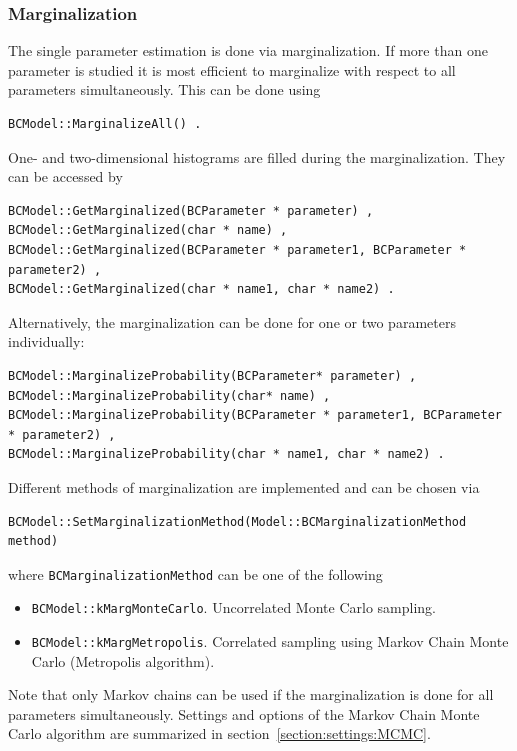 \documentclass[11pt, a4paper]{article}
\begin{document}

\subsubsection{Marginalization} 
\label{subsubsection:marginalization}

\noindent 
The single parameter estimation is done via marginalization. If more
than one parameter is studied it is most efficient to marginalize with
respect to all parameters simultaneously. This can be done using
%
\begin{verbatim}
BCModel::MarginalizeAll() . 
\end{verbatim} 

\noindent 
One- and two-dimensional histograms are filled during the
marginalization. They can be accessed by
%
\begin{verbatim}
BCModel::GetMarginalized(BCParameter * parameter) ,
BCModel::GetMarginalized(char * name) ,
BCModel::GetMarginalized(BCParameter * parameter1, BCParameter * parameter2) ,
BCModel::GetMarginalized(char * name1, char * name2) .
\end{verbatim}

\noindent 
Alternatively, the marginalization can be done for one or two
parameters individually: 
%
\begin{verbatim}
BCModel::MarginalizeProbability(BCParameter* parameter) ,
BCModel::MarginalizeProbability(char* name) , 
BCModel::MarginalizeProbability(BCParameter * parameter1, BCParameter * parameter2) ,
BCModel::MarginalizeProbability(char * name1, char * name2) .
\end{verbatim} 

\noindent 
Different methods of marginalization are implemented and can be chosen
via
%
\begin{verbatim}
BCModel::SetMarginalizationMethod(Model::BCMarginalizationMethod method)
\end{verbatim} 

\noindent
where \verb|BCMarginalizationMethod| can be one of the following 
% 
\begin{itemize}
\item \verb|BCModel::kMargMonteCarlo|. Uncorrelated Monte Carlo sampling.
\item \verb|BCModel::kMargMetropolis|. Correlated sampling using
  Markov Chain Monte Carlo (Metropolis algorithm).
\end{itemize} 

\noindent 
Note that only Markov chains can be used if the marginalization is
done for all parameters simultaneously. Settings and options of the
Markov Chain Monte Carlo algorithm are summarized in
section~\ref{section:settings:MCMC}. \\
\end{document}
